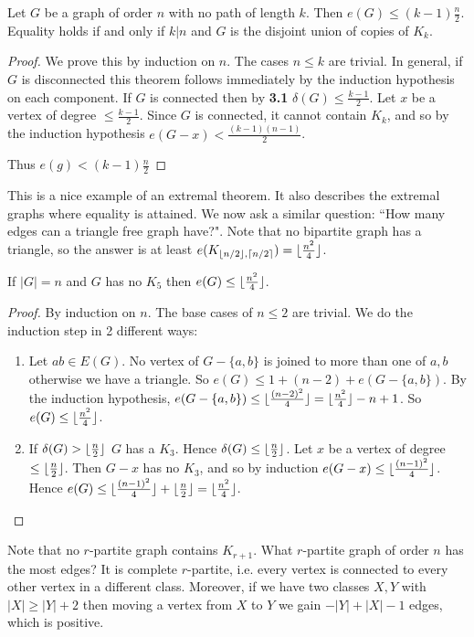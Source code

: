 \documentclass[10pt,a4paper]{article}
\begin{document}
\begin{theorem}
Let $G$ be a graph of order $n$ with no path of length $k$. Then $e(G) \leq  (k-1)\frac{n}{2}$. Equality holds if and only if $k|n$ and $G$ is the disjoint union of copies of $K_k$.
\end{theorem}
\begin{proof}
We prove this by induction on $n$. The cases $n \leq k$ are trivial. In general, if $G$ is disconnected this theorem follows immediately by the induction hypothesis on each component. If $G$ is connected then by \textbf{3.1} $\delta(G) \leq \frac{k-1}{2}$. Let $x$ be a vertex of degree $\leq \frac{k-1}{2}$. Since $G$ is connected, it cannot contain $K_k$, and so by the induction hypothesis $e(G-x) < \frac{(k-1)(n-1)}{2}$.

Thus $e(g) < (k-1)\frac{n}{2}$
\end{proof}

This is a nice example of an extremal theorem. It also describes the extremal graphs where equality is attained. We now ask a similar question: ``How many edges can a triangle free graph have?". Note that no bipartite graph has a triangle, so the answer is at least $e(K_{\lfloor n/2 \rfloor, \lceil n/2 \rceil}) = \lfloor \frac{n^2}{4} \rfloor$.

\begin{theorem}[Mantel, 1907]
If $|G| = n$ and $G$ has no $K_5$ then $e(G) \leq \lfloor \frac{n^2}{4} \rfloor$.
\end{theorem}
\begin{proof}
By induction on $n$. The base cases of $n\leq 2$ are trivial. We do the induction step in 2 different ways:
\begin{enumerate}
\item Let $ab \in E(G)$. No vertex of $G-\{a,b\}$ is joined to more than one of $a, b$ otherwise we have a triangle. So $e(G) \leq 1 + (n-2) + e(G-\{a,b\})$. By the induction hypothesis, $e(G-\{a,b\}) \leq \lfloor \frac{(n-2)^2}{4} \rfloor = \lfloor \frac{n^2}{4} \rfloor - n + 1$. So $e(G) \leq \lfloor \frac{n^2}{4} \rfloor$.
\item If $\delta(G) > \lfloor \frac{n}{2} \rfloor$ $G$ has a $K_3$. Hence $\delta(G) \leq \lfloor \frac{n}{2} \rfloor$. Let $x$ be a vertex of degree $\leq \lfloor \frac{n}{2} \rfloor$. Then $G-x$ has no $K_3$, and so by induction $e(G-x)\leq \lfloor \frac{(n-1)^2}{4} \rfloor$. Hence $e(G) \leq \lfloor \frac{(n-1)^2}{4} \rfloor + \lfloor \frac{n}{2} \rfloor = \lfloor \frac{n^2}{4} \rfloor$.
\end{enumerate}
\end{proof}

Note that no $r$-partite graph contains $K_{r+1}$. What $r$-partite graph of order $n$ has the most edges? It is complete $r$-partite, i.e. every vertex is connected to every other vertex in a different class. Moreover, if we have two classes $X, Y$ with $|X|\geq |Y|+2$ then moving a vertex from $X$ to $Y$ we gain $-|Y|+|X|-1$ edges, which is positive.
\end{document}
